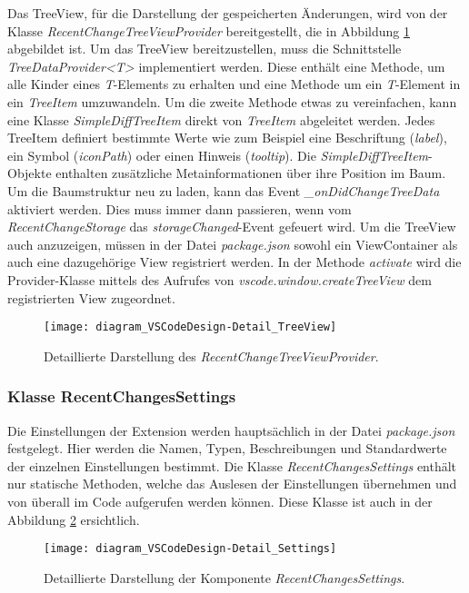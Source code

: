 Das TreeView, für die Darstellung der gespeicherten Änderungen, 
wird von der Klasse \emph{RecentChangeTreeViewProvider} bereitgestellt,
die in Abbildung \ref{fig:diagram_VSCodeDesign-Detail_TreeView} abgebildet ist.
Um das TreeView bereitzustellen, muss die Schnittstelle
\emph{TreeDataProvider<T>} implementiert werden. Diese
enthält eine Methode, um alle Kinder eines \emph{T}-Elements
zu erhalten und eine Methode um ein \emph{T}-Element in
ein \emph{TreeItem} umzuwandeln. Um die zweite Methode etwas zu
vereinfachen, kann eine Klasse \emph{SimpleDiffTreeItem} direkt
von \emph{TreeItem} abgeleitet werden. Jedes TreeItem definiert
bestimmte Werte wie zum Beispiel eine Beschriftung (\emph{label}), 
ein Symbol (\emph{iconPath}) oder einen Hinweis (\emph{tooltip}).
Die \emph{SimpleDiffTreeItem}-Objekte enthalten zusätzliche
Metainformationen über ihre Position im Baum. Um die Baumstruktur
neu zu laden, kann das Event \emph{\_onDidChangeTreeData} aktiviert
werden. Dies muss immer dann passieren, wenn vom \emph{RecentChangeStorage}
das \emph{storageChanged}-Event gefeuert wird.
Um die TreeView auch anzuzeigen, müssen in der Datei \emph{package.json}
sowohl ein ViewContainer als auch eine dazugehörige View registriert werden.
In der Methode \emph{activate} wird die Provider-Klasse mittels
des Aufrufes von \emph{vscode.window.createTreeView} dem registrierten
View zugeordnet.

\begin{figure}
    \centering
    \texttt{[image: diagram\_VSCodeDesign-Detail\_TreeView]}
    \caption{Detaillierte Darstellung des \emph{RecentChangeTreeViewProvider}.}
    \label{fig:diagram_VSCodeDesign-Detail_TreeView}
\end{figure}   

\subsubsection{Klasse RecentChangesSettings}

Die Einstellungen der Extension werden hauptsächlich in der Datei
\emph{package.json} festgelegt. Hier werden die Namen, Typen, 
Beschreibungen und Standardwerte der einzelnen Einstellungen bestimmt.
Die Klasse \emph{RecentChangesSettings} enthält nur statische 
Methoden, welche das Auslesen der Einstellungen übernehmen und
von überall im Code aufgerufen werden können.
Diese Klasse ist auch in der Abbildung \ref{fig:diagram_VSCodeDesign-Detail_Settings} 
ersichtlich.

\begin{figure}
    \centering
    \texttt{[image: diagram\_VSCodeDesign-Detail\_Settings]}
    \caption{Detaillierte Darstellung der Komponente \emph{RecentChangesSettings}.}
    \label{fig:diagram_VSCodeDesign-Detail_Settings}
\end{figure} 

